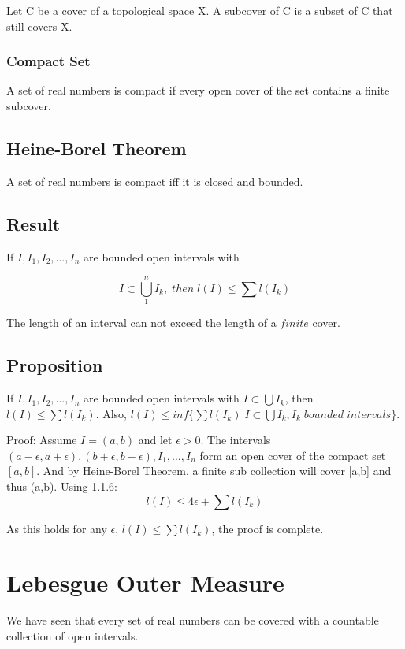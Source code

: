 \documentclass{article}
\begin{document}
 Let C be a cover of a topological space X. A subcover of C is a subset of C that still covers X.
 
 \subsubsection{Compact Set}
 
A set of real numbers is compact if every open cover of the set contains a finite subcover.

\subsection{Heine-Borel Theorem}
A set of real numbers is compact iff it is closed and bounded.

\subsection{Result}
If $I,I_1,I_2,\dots ,I_n$ are bounded open intervals with 

$$ I \subset \bigcup_{1}^{n}I_k ,\; then  \;l(I) \leq \sum l(I_k)$$

The length of an interval can not exceed the length of a $finite$ cover.

\subsection{Proposition}

If $I,I_1,I_2,\dots ,I_n$ are bounded open intervals with $ I \subset \bigcup I_k$, then $l(I) \leq \sum l(I_k)$. Also, $ l(I) \leq inf\{ \sum l(I_k) | I \subset \bigcup I_k, I_k \; bounded \; intervals \}$.\bigskip

Proof: Assume $I =(a,b)$ and let $\epsilon > 0$. The intervals $(a-\epsilon,a+\epsilon),(b+\epsilon,b-\epsilon),I_1,\dots ,I_n$ form an open cover of the compact set $[a,b]$. And by Heine-Borel Theorem, a finite sub collection will cover [a,b] and thus (a,b).
Using 1.1.6:
$$  l(I) \leq 4\epsilon +  \sum l(I_k)$$

As this holds for any $\epsilon$, $l(I) \leq \sum l(I_k)$, the proof is complete.
\section{Lebesgue Outer Measure}

We have seen that every set of real numbers can be covered with a countable collection of open intervals.
\end{document}
